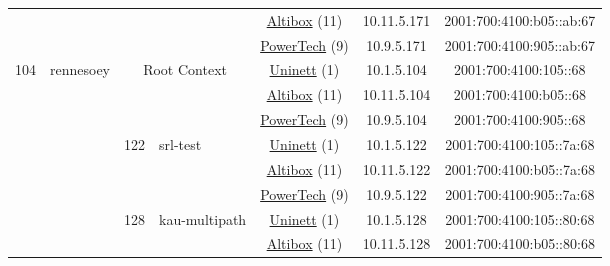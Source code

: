 \begin{small}
\begin{center}
\begin{longtable}{|c|c|c|c|c|c|c|c|}
  &  &  &  & \multicolumn{2}{|c|}{\tiny{\href{https://www.altibox.no}{Altibox} (11)}} & \tiny{10.11.5.171} & \tiny{2001:700:4100:b05::ab:67} \\* \cline{5-5}\cline{6-6}\cline{7-7}\cline{8-8}
  &  &  &  & \multicolumn{2}{|c|}{\tiny{\href{http://www.powertech.no}{PowerTech} (9)}} & \tiny{10.9.5.171} & \tiny{2001:700:4100:905::ab:67} \\ \hline
 \multirow{33}{*}{\tiny{104}} & \multicolumn{1}{|l|}{\multirow{33}{*}{\tiny{rennesoey}}} & \multicolumn{2}{|c|}{\multirow{3}{*}{\tiny{Root Context}}} & \multicolumn{2}{|c|}{\tiny{\href{https://www.uninett.no}{Uninett} (1)}} & \tiny{10.1.5.104} & \tiny{2001:700:4100:105::68} \\* \cline{5-5}\cline{6-6}\cline{7-7}\cline{8-8}
  &  & \multicolumn{2}{|c|}{} & \multicolumn{2}{|c|}{\tiny{\href{https://www.altibox.no}{Altibox} (11)}} & \tiny{10.11.5.104} & \tiny{2001:700:4100:b05::68} \\* \cline{5-5}\cline{6-6}\cline{7-7}\cline{8-8}
  &  & \multicolumn{2}{|c|}{} & \multicolumn{2}{|c|}{\tiny{\href{http://www.powertech.no}{PowerTech} (9)}} & \tiny{10.9.5.104} & \tiny{2001:700:4100:905::68} \\* \cline{3-3}\cline{4-4}\cline{5-5}\cline{6-6}\cline{7-7}\cline{8-8}
  &  & \multirow{3}{*}{\tiny{122}} & \multicolumn{1}{|l|}{\multirow{3}{*}{\tiny{srl-test}}} & \multicolumn{2}{|c|}{\tiny{\href{https://www.uninett.no}{Uninett} (1)}} & \tiny{10.1.5.122} & \tiny{2001:700:4100:105::7a:68} \\* \cline{5-5}\cline{6-6}\cline{7-7}\cline{8-8}
  &  &  &  & \multicolumn{2}{|c|}{\tiny{\href{https://www.altibox.no}{Altibox} (11)}} & \tiny{10.11.5.122} & \tiny{2001:700:4100:b05::7a:68} \\* \cline{5-5}\cline{6-6}\cline{7-7}\cline{8-8}
  &  &  &  & \multicolumn{2}{|c|}{\tiny{\href{http://www.powertech.no}{PowerTech} (9)}} & \tiny{10.9.5.122} & \tiny{2001:700:4100:905::7a:68} \\* \cline{3-3}\cline{4-4}\cline{5-5}\cline{6-6}\cline{7-7}\cline{8-8}
  &  & \multirow{3}{*}{\tiny{128}} & \multicolumn{1}{|l|}{\multirow{3}{*}{\tiny{kau-multipath}}} & \multicolumn{2}{|c|}{\tiny{\href{https://www.uninett.no}{Uninett} (1)}} & \tiny{10.1.5.128} & \tiny{2001:700:4100:105::80:68} \\* \cline{5-5}\cline{6-6}\cline{7-7}\cline{8-8}
  &  &  &  & \multicolumn{2}{|c|}{\tiny{\href{https://www.altibox.no}{Altibox} (11)}} & \tiny{10.11.5.128} & \tiny{2001:700:4100:b05::80:68} \\* \cline{5-5}\cline{6-6}\cline{7-7}\cline{8-8}

\end{longtable}
\end{center}
\end{small}
